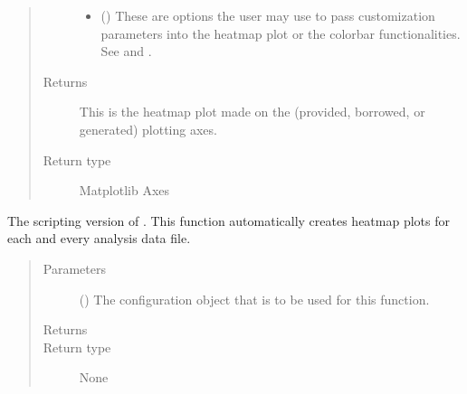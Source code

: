 \documentclass[letterpaper,10pt,english]{sphinxmanual}
\begin{document}
\begin{fulllineitems}
\begin{quote}
\begin{description}
\begin{itemize}
\item {} 
 (\sphinxstyleliteralemphasis{\sphinxupquote{ (}}\sphinxstyleliteralemphasis{\sphinxupquote{)}}) \textendash{} These are options the user may use to pass customization
parameters into the heat\sphinxhyphen{}map plot or the color\sphinxhyphen{}bar
functionalities.
See  and
.

\end{itemize}

\item[{Returns}] \leavevmode
{} \textendash{} This is the heatmap plot made on the (provided, borrowed, or
generated) plotting axes.

\item[{Return type}] \leavevmode
Matplotlib Axes

\end{description}\end{quote}

\end{fulllineitems}


\begin{fulllineitems}
\label{\detokenize{docstrings/ifa_smeargle.plotting.heatmap:ifa_smeargle.plotting.heatmap.script_plot_heatmap}}
The scripting version of . This function
automatically creates heat\sphinxhyphen{}map plots for each and every analysis
data file.
\begin{quote}\begin{description}
\item[{Parameters}] \leavevmode
{} () \textendash{} The configuration object that is to be used for this
function.

\item[{Returns}] \leavevmode


\item[{Return type}] \leavevmode
None

\end{description}\end{quote}

\end{fulllineitems}
\end{document}
